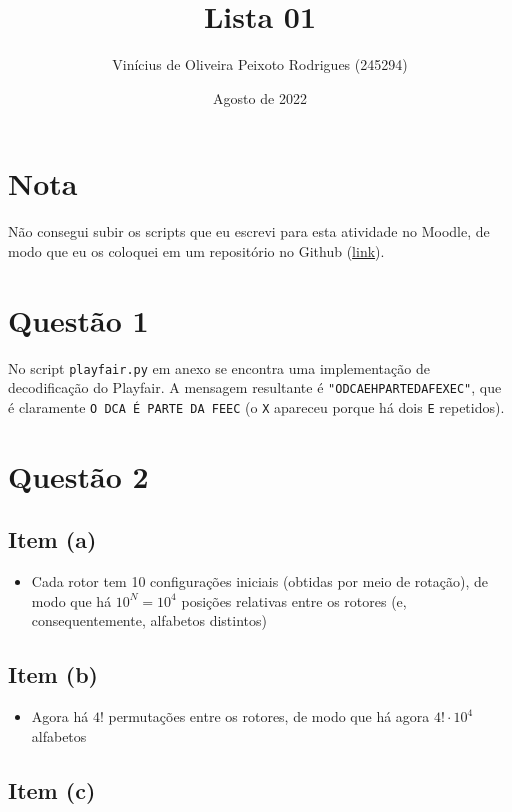 \documentclass{article}
\title{Lista 01}
\author{Vinícius de Oliveira Peixoto Rodrigues (245294)}
\date{Agosto de 2022}
\begin{document}
\maketitle

\section*{Nota}
Não consegui subir os scripts que eu escrevi para esta atividade no Moodle, de modo que eu os coloquei em um repositório no Github (\href{https://github.com/nukelet/eg812/blob/main/lista_1/scripts.zip?raw=true}{link}).

\section*{Questão 1}

No script \texttt{playfair.py} em anexo se encontra uma implementação de decodificação do Playfair. A mensagem resultante é \texttt{"ODCAEHPARTEDAFEXEC"}, que é claramente \texttt{O DCA É PARTE DA FEEC} (o \texttt{X} apareceu porque há dois \texttt{E} repetidos).

\section*{Questão 2}

\subsection*{Item (a)}

\begin{itemize}
    \item Cada rotor tem 10 configurações iniciais (obtidas por meio de rotação), de modo que há $10^N = 10^4$ posições relativas entre os rotores (e, consequentemente, alfabetos distintos)
\end{itemize}

\subsection*{Item (b)}

\begin{itemize}
    \item Agora há $4!$ permutações entre os rotores, de modo que há agora $4! \cdot 10^4$ alfabetos
\end{itemize}

\subsection*{Item (c)}
\end{document}
